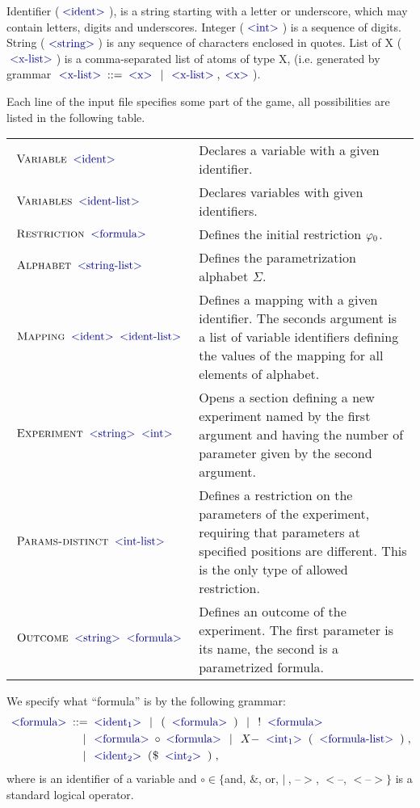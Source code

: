 Identifier ($\symb{ident}$), is a string starting with a letter or underscore,
  which may contain letters, digits and underscores.
Integer ($\symb{int}$) is a sequence of digits.
String ($\symb{string}$) is any sequence of characters enclosed in quotes.
List of X ($\symb{x-list}$) is a comma-separated list of atoms of type X,
(i.e. generated by grammar $\symb{x-list}::=\symb{x} \| \symb{x-list} , \symb{x}$).

Each line of the input file specifies some part of the game,
  all possibilities are listed in the following table.

\begin{tabular}{|p{}|p{}|} \hline
$\txt{Variable} \symb{ident}$ & Declares a variable with a given identifier. \\
$\txt{Variables} \symb{ident-list}$ & Declares variables with given identifiers. \\
$\txt{Restriction} \symb{formula}$ & Defines the initial restriction $\varphi_0$. \\
$\txt{Alphabet} \symb{string-list}$ & Defines the parametrization alphabet $\Sigma$. \\
$\txt{Mapping} \symb{ident} \symb{ident-list}$ & Defines a mapping with a given identifier.
  The seconds argument is a list of variable identifiers defining the values of the mapping for all elements of alphabet.    \\
$\txt{Experiment} \symb{string} \symb{int}$ & Opens a section defining a new experiment named by the first argument and having the number of parameter given by the second argument. \\
$\txt{Params-distinct} \symb{int-list}$ & Defines a restriction on the parameters of the experiment,
requiring that parameters at specified positions are different.
This is the only type of allowed restriction. \\
$\txt{Outcome} \symb{string} \symb{formula}$ & Defines an outcome of the experiment. The first parameter is its name, the second is a parametrized formula. \\\hline
\end{tabular} \medskip

We specify what ``formula'' is by the following grammar:
\begin{align*}
\symb{formula} ::=\;
   & \symb{ident$_1$} \| \txt{(} \symb{formula} \txt{)}
      \| \txt{!} \symb{formula} \\
\| & \symb{formula} \circ \symb{formula}
      \| \txt{$X-$} \symb{int$_1$} \txt{(} \symb{formula-list} \txt{)}, \\
\| & \symb{ident$_2$} \txt{(\$} \symb{int$_2$} \txt{)},
\end{align*}
where  is an identifier of a variable
and $\circ\in\{$and, $\&$, or, $|\:$, --$>$, $<$--, $<$--$>\}$
is a standard logical operator.

